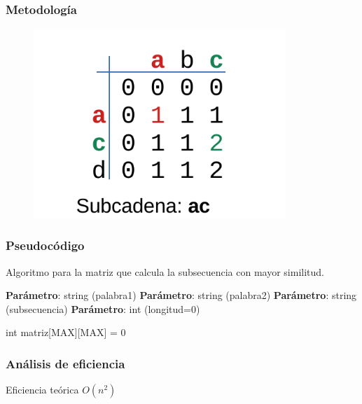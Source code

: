 \documentclass[13pt]{beamer}
\begin{document}
    \begin{frame}
        \frametitle{Metodología}
        \begin{figure}[H] 
            \centering
            \includegraphics[width=0.85\textwidth]{dibujito.pdf}
        \end{figure}
    \end{frame}



    \begin{frame}
        \frametitle{Pseudocódigo}
    
        \begin{algorithm}[H]
            \caption{Algoritmo para la matriz que calcula la subsecuencia con mayor similitud.}\label{alg:simil}
            \begin{minipage}{0.92\textwidth}
            \textbf{Parámetro}: string (palabra1)
            \textbf{Parámetro}: string (palabra2)
            \textbf{Parámetro}: string (subsecuencia)
            \textbf{Parámetro}: int (longitud=0)
            \end{minipage}

            int matriz[MAX][MAX] = {0}

             {
                 {
                }
            }
        \end{algorithm}
    \end{frame}

	\begin{frame}
		\frametitle{Análisis de eficiencia}
		
		\begin{block}{Eficiencia teórica}
			\centering
			$O(n^{2})$
		\end{block}
		
	\end{frame}
\end{document}
